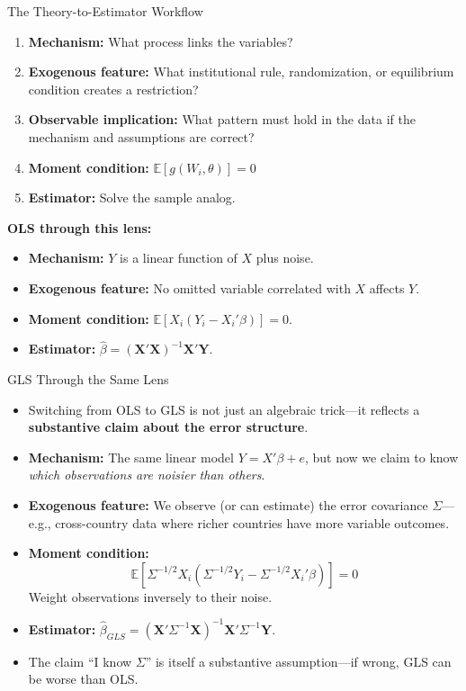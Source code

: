 \documentclass[aspectratio=169, handout]{beamer}
\numberwithin{equation}{section}
\begin{document}
\begin{frame}{The Theory-to-Estimator Workflow}
\begin{tcolorbox}[colback=blue!5, colframe=blue!50, title=From Mechanism to Estimator]
\begin{enumerate}
\item \textbf{Mechanism:} What process links the variables?
\item \textbf{Exogenous feature:} What institutional rule, randomization, or equilibrium condition creates a restriction?
\item \textbf{Observable implication:} What pattern must hold in the data if the mechanism and assumptions are correct?
\item \textbf{Moment condition:} $\mathbb{E}[g(W_i, \theta)]=0$
\item \textbf{Estimator:} Solve the sample analog.
\end{enumerate}
\end{tcolorbox}

\medskip\pause
\textbf{OLS through this lens:}
\begin{itemize}
\item \textbf{Mechanism:} $Y$ is a linear function of $X$ plus noise.
\item \textbf{Exogenous feature:} No omitted variable correlated with $X$ affects $Y$.
\item \textbf{Moment condition:} $\mathbb{E}[X_i(Y_i - X_i'\beta)]=0$.
\item \textbf{Estimator:} $\hat{\beta}=(\bm{X}'\bm{X})^{-1}\bm{X}'\bm{Y}$.
\end{itemize}
\end{frame}

\begin{frame}{GLS Through the Same Lens}
\begin{itemize}
\item Switching from OLS to GLS is not just an algebraic trick---it reflects a \textbf{substantive claim about the error structure}.\pause

\item \textbf{Mechanism:} The same linear model $Y = X'\beta + e$, but now we claim to know \emph{which observations are noisier than others}.\pause

\item \textbf{Exogenous feature:} We observe (or can estimate) the error covariance $\Sigma$---e.g., cross-country data where richer countries have more variable outcomes.\pause

\item \textbf{Moment condition:}
$$\mathbb{E}[\Sigma^{-1/2}X_i(\Sigma^{-1/2}Y_i - \Sigma^{-1/2}X_i'\beta)]=0$$
Weight observations inversely to their noise.\pause

\item \textbf{Estimator:} $\hat{\beta}_{GLS}=(\bm{X}'\Sigma^{-1}\bm{X})^{-1}\bm{X}'\Sigma^{-1}\bm{Y}$.

\item The claim ``I know $\Sigma$'' is itself a substantive assumption---if wrong, GLS can be worse than OLS.
\end{itemize}
\end{frame}
\end{document}
